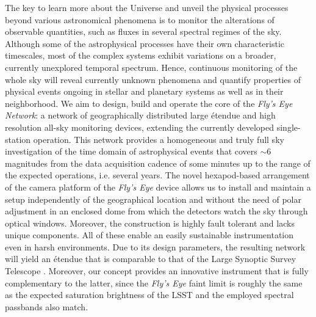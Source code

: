 The key to learn more about the Universe and unveil the physical 
processes beyond various astronomical phenomena is to monitor the 
alterations of observable quantities, such as fluxes in several spectral 
regimes of the sky. Although some of the astrophysical processes have 
their own characteristic timescales, most of the complex systems exhibit 
variations on a broader, currently unexplored temporal spectrum. Hence, 
continuous monitoring of the whole sky will reveal currently 
unknown phenomena and quantify properties of physical events ongoing in 
stellar and planetary systems as well as in their neighborhood. We aim 
to design, build and operate the core of the {\it Fly's Eye Network}: a 
network of geographically distributed large \'etendue and high 
resolution all-sky monitoring devices, extending the currently developed 
single-station operation. This network provides a homogeneous and 
truly full sky investigation of the time domain of astrophysical events 
that covers $\sim6$ magnitudes from the data acquisition cadence of some 
minutes up to the range of the expected operations, i.e. several years. 
The novel hexapod-based arrangement of the camera platform of the 
{\it Fly's Eye} device allows us to install and 
maintain a setup independently of 
the geographical location and without the need of polar adjustment in an 
enclosed dome from which the detectors watch the sky through optical 
windows. Moreover, the construction is highly fault tolerant and lacks 
unique components. All of these enable an easily sustainable 
instrumentation even in harsh environments. Due to its design 
parameters, the resulting network will yield an \'etendue that is 
comparable to that of the Large Synoptic Survey Telescope 
\citep[LSST,][]{ivezic2008}.
Moreover, our concept provides an innovative instrument that is fully 
complementary to the latter, since the {\it Fly's Eye} faint limit is roughly 
the same as the expected saturation brightness of the LSST and the 
employed spectral passbands also match.

